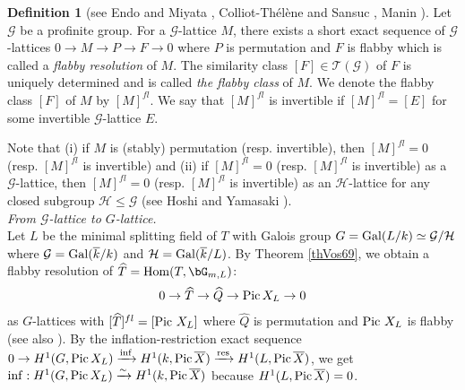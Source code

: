 \documentclass{amsart}
\theoremstyle{plain}
\theoremstyle{definition}
\newtheorem{definition}[theorem]{Definition}
\theoremstyle{remark}
\newcommand{\cT}{\mathcal{T}}
\newcounter{sub}\def\tr{\mbox{tr }}
\begin{document}
\begin{definition}[{see Endo and Miyata \cite[Lemma 1.1]{EM75}, Colliot-Th\'el\`ene and Sansuc \cite[Lemme 3]{CTS77}, Manin \cite[Appendix, page 286]{Man86}}]\label{defF}
Let $\mathcal{G}$ be a profinite group. 
For a $\mathcal{G}$-lattice $M$, there exists a short exact sequence of 
$\mathcal{G}$-lattices
$0 \rightarrow M \rightarrow P \rightarrow F \rightarrow 0$
where $P$ is permutation and $F$ is flabby which is called a 
{\it flabby resolution} of $M$. 
The similarity class $[F]\in \cT(\mathcal{G})$ 
of $F$ is uniquely determined and is called {\it the flabby class} of $M$. 
We denote the flabby class $[F]$ of $M$ by $[M]^{fl}$. 
We say that $[M]^{fl}$ is invertible if $[M]^{fl}=[E]$ for some 
invertible $\mathcal{G}$-lattice $E$. 
\end{definition}
%
Note that (i) if $M$ is (stably) permutation (resp. invertible), 
then $[M]^{fl}=0$ (resp. $[M]^{fl}$ is invertible) 
and (ii) if $[M]^{fl}=0$ (resp. $[M]^{fl}$ is invertible) 
as a $\mathcal{G}$-lattice, 
then $[M]^{fl}=0$ (resp. $[M]^{fl}$ is invertible) as an $\mathcal{H}$-lattice 
for any closed subgroup $\mathcal{H}\leq \mathcal{G}$ (see Hoshi and Yamasaki 
\cite[Lemma 2.17]{HY17}).\\ 

{\it From $\mathcal{G}$-lattice to $G$-lattice.}\\

Let $L$ be the minimal splitting field of 
$T$ with Galois group $G={\rm Gal}(L/k)\simeq \mathcal{G}/\mathcal{H}$ 
where $\mathcal{G}={\rm Gal}(\overline{k}/k)$ 
and $\mathcal{H}={\rm Gal}(\overline{k}/L)$. 
%
By Theorem \ref{thVos69}, 
we obtain a flabby resolution of $\widehat{T}={\rm Hom}(T,\bG_{m,L})$: 
\begin{align*}
0\to \widehat{T}\to \widehat{Q}\to {\rm Pic}\, X_L\to 0
\end{align*}
as $G$-lattices with $[\widehat{T}]^{fl}=[{\rm Pic}\ X_L]$ 
where $\widehat{Q}$ is permutation 
and ${\rm Pic}\ X_L$ is flabby (see also \cite[Section 1]{Vos74}). 
By the inflation-restriction exact sequence 
$0\to H^1(G,{\rm Pic}\, X_L)\xrightarrow{\rm inf} 
H^1(k,{\rm Pic}\,\overline{X})\xrightarrow{\rm res} 
H^1(L,{\rm Pic}\,\overline{X})$, 
we get 
${\rm inf}: H^1(G,{\rm Pic}\, X_L)\xrightarrow{\sim} 
H^1(k,{\rm Pic}\,\overline{X})$ 
because $H^1(L,{\rm Pic}\,\overline{X})=0$. 
\end{document}
